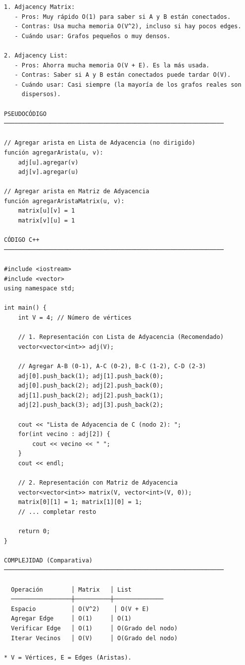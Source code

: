 \begin{lstlisting}
1. Adjacency Matrix:
   - Pros: Muy rápido O(1) para saber si A y B están conectados.
   - Contras: Usa mucha memoria O(V^2), incluso si hay pocos edges.
   - Cuándo usar: Grafos pequeños o muy densos.

2. Adjacency List:
   - Pros: Ahorra mucha memoria O(V + E). Es la más usada.
   - Contras: Saber si A y B están conectados puede tardar O(V).
   - Cuándo usar: Casi siempre (la mayoría de los grafos reales son
     dispersos).

PSEUDOCÓDIGO
──────────────────────────────────────────────────────────────

// Agregar arista en Lista de Adyacencia (no dirigido)
función agregarArista(u, v):
    adj[u].agregar(v)
    adj[v].agregar(u)

// Agregar arista en Matriz de Adyacencia
función agregarAristaMatrix(u, v):
    matrix[u][v] = 1
    matrix[v][u] = 1

CÓDIGO C++
──────────────────────────────────────────────────────────────

#include <iostream>
#include <vector>
using namespace std;

int main() {
    int V = 4; // Número de vértices
    
    // 1. Representación con Lista de Adyacencia (Recomendado)
    vector<vector<int>> adj(V);

    // Agregar A-B (0-1), A-C (0-2), B-C (1-2), C-D (2-3)
    adj[0].push_back(1); adj[1].push_back(0);
    adj[0].push_back(2); adj[2].push_back(0);
    adj[1].push_back(2); adj[2].push_back(1);
    adj[2].push_back(3); adj[3].push_back(2);

    cout << "Lista de Adyacencia de C (nodo 2): ";
    for(int vecino : adj[2]) {
        cout << vecino << " ";
    }
    cout << endl;

    // 2. Representación con Matriz de Adyacencia
    vector<vector<int>> matrix(V, vector<int>(V, 0));
    matrix[0][1] = 1; matrix[1][0] = 1;
    // ... completar resto

    return 0;
}

COMPLEJIDAD (Comparativa)
──────────────────────────────────────────────────────────────

  Operación        │ Matrix   │ List
  ─────────────────┼──────────┼──────────────
  Espacio          │ O(V^2)    │ O(V + E)
  Agregar Edge     │ O(1)     │ O(1)
  Verificar Edge   │ O(1)     │ O(Grado del nodo)
  Iterar Vecinos   │ O(V)     │ O(Grado del nodo)

* V = Vértices, E = Edges (Aristas).
\end{lstlisting}

